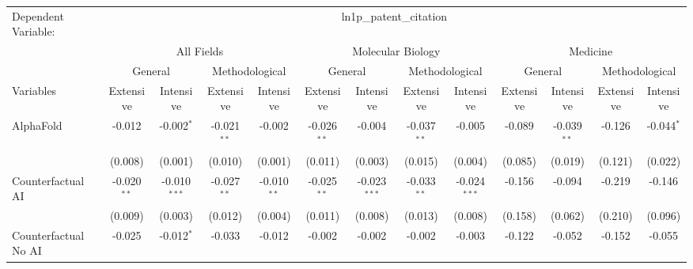 \begingroup
\centering
\begin{tabular}{lcccccccccccc}
   \tabularnewline \midrule \midrule
   Dependent Variable: & \multicolumn{12}{c}{ln1p\_patent\_citation}\\
 & \multicolumn{4}{c}{All Fields} & \multicolumn{4}{c}{Molecular Biology} & \multicolumn{4}{c}{Medicine} \\
\cmidrule(lr){2-5} \cmidrule(lr){6-9} \cmidrule(lr){10-13}
 & \multicolumn{2}{c}{General} & \multicolumn{2}{c}{Methodological} & \multicolumn{2}{c}{General} & \multicolumn{2}{c}{Methodological} & \multicolumn{2}{c}{General} & \multicolumn{2}{c}{Methodological} \\
\cmidrule(lr){2-3} \cmidrule(lr){4-5} \cmidrule(lr){6-7} \cmidrule(lr){8-9} \cmidrule(lr){10-11} \cmidrule(lr){12-13}
Variables & \multicolumn{1}{c}{Extensive} & \multicolumn{1}{c}{Intensive} & \multicolumn{1}{c}{Extensive} & \multicolumn{1}{c}{Intensive} & \multicolumn{1}{c}{Extensive} & \multicolumn{1}{c}{Intensive} & \multicolumn{1}{c}{Extensive} & \multicolumn{1}{c}{Intensive} & \multicolumn{1}{c}{Extensive} & \multicolumn{1}{c}{Intensive} & \multicolumn{1}{c}{Extensive} & \multicolumn{1}{c}{Intensive} \\
\cmidrule(lr){1-1}\cmidrule(lr){2-2} \cmidrule(lr){3-3} \cmidrule(lr){4-4} \cmidrule(lr){5-5} \cmidrule(lr){6-6} \cmidrule(lr){7-7} \cmidrule(lr){8-8} \cmidrule(lr){9-9} \cmidrule(lr){10-10} \cmidrule(lr){11-11} \cmidrule(lr){12-12} \cmidrule(lr){13-13}
   AlphaFold                                & -0.012        & -0.002$^{*}$   & -0.021$^{**}$ & -0.002        & -0.026$^{**}$ & -0.004         & -0.037$^{**}$ & -0.005         & -0.089  & -0.039$^{**}$ & -0.126  & -0.044$^{*}$\\   
                                            & (0.008)       & (0.001)        & (0.010)       & (0.001)       & (0.011)       & (0.003)        & (0.015)       & (0.004)        & (0.085) & (0.019)       & (0.121) & (0.022)\\   
   Counterfactual AI                        & -0.020$^{**}$ & -0.010$^{***}$ & -0.027$^{**}$ & -0.010$^{**}$ & -0.025$^{**}$ & -0.023$^{***}$ & -0.033$^{**}$ & -0.024$^{***}$ & -0.156  & -0.094        & -0.219  & -0.146\\   
                                            & (0.009)       & (0.003)        & (0.012)       & (0.004)       & (0.011)       & (0.008)        & (0.013)       & (0.008)        & (0.158) & (0.062)       & (0.210) & (0.096)\\   
   Counterfactual No AI                     & -0.025        & -0.012$^{*}$   & -0.033        & -0.012        & -0.002        & -0.002         & -0.002        & -0.003         & -0.122  & -0.052        & -0.152  & -0.055\\   

\end{tabular}
